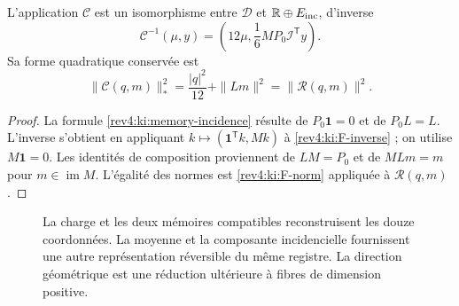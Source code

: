 \begin{corollary}
\label{rev4:ki:composition}
L’application \(\mathcal C\) est un isomorphisme entre
\(\mathcal D\) et \(\mathbb R\oplus E_{\rm inc}\), d’inverse
\begin{equation}
 \mathcal C^{-1}(\mu,y)=
 \left(12\mu,\frac16MP_0\mathcal I^{\mathsf T}y\right).
 \label{rev4:ki:C-inverse}
\end{equation}
Sa forme quadratique conservée est
\[
 \|\mathcal C(q,m)\|_*^2=
 \frac{|q|^2}{12}+\|Lm\|^2=\|\mathcal R(q,m)\|^2.
\]
\end{corollary}
\begin{proof}
La formule \eqref{rev4:ki:memory-incidence} résulte de
\(P_0\mathbf1=0\) et de \(P_0L=L\). L’inverse s’obtient
en appliquant \(k\mapsto(\mathbf1^{\mathsf T}k,Mk)\) à
\eqref{rev4:ki:F-inverse} ; on utilise \(M\mathbf1=0\).
Les identités de composition proviennent de \(LM=P_0\) et de
\(MLm=m\) pour \(m\in\operatorname{im}M\). L’égalité des
normes est \eqref{rev4:ki:F-norm} appliquée à \(\mathcal R(q,m)\).
\end{proof}

\begin{figure}[htbp]
\centering
{}
\caption{La charge et les deux mémoires compatibles reconstruisent les douze
coordonnées. La moyenne et la composante incidencielle fournissent une autre
représentation réversible du même registre. La direction géométrique
est une réduction ultérieure à fibres de dimension positive.}
\label{rev4:ki:figure}
\end{figure}

